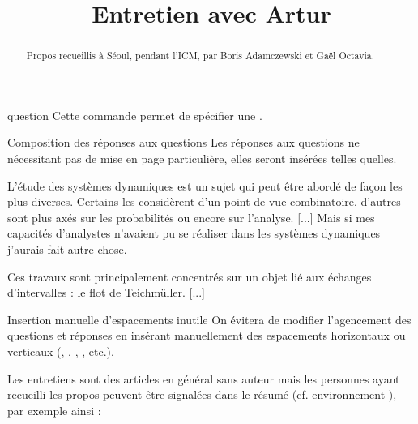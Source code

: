 \begin{docCommand}{question}{}
  Cette commande permet de spécifier une .
\end{docCommand}

\begin{dbremark}{Composition des réponses aux questions}{}
  Les réponses aux questions ne nécessitant pas de mise en page particulière,
  elles seront insérées telles quelles.
\end{dbremark}

\begin{bodycode}

L'étude des systèmes dynamiques est un sujet qui peut être abordé de façon les
plus diverses.  Certains les considèrent d'un point de vue combinatoire,
d'autres sont plus axés sur les probabilités ou encore sur l'analyse. [...]
Mais si mes capacités d'analystes n'avaient pu se réaliser dans les systèmes
dynamiques j'aurais fait autre chose.


Ces travaux sont principalement concentrés sur un objet lié aux échanges
d'intervalles : le flot de Teichmüller. [...]
\end{bodycode}

\begin{dbwarning}{Insertion manuelle d'espacements inutile}{}
  On évitera de modifier l'agencement des questions et réponses en insérant
  manuellement des espacements horizontaux ou verticaux
  (, , ,
  , etc.).
\end{dbwarning}

Les entretiens sont des articles en général sans auteur mais les personnes ayant
recueilli les propos peuvent être signalées dans le résumé (cf. environnement
), par exemple ainsi :

\begin{bodycode}
\title{Entretien avec Artur }
\begin{abstract}
  Propos recueillis à Séoul, pendant l'ICM, par Boris Adamczewski et Gaël Octavia.
\end{abstract}
\maketitle
\end{bodycode}

